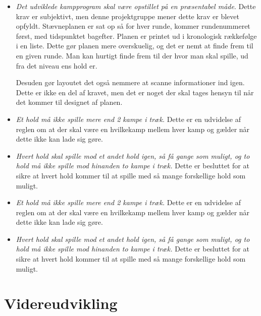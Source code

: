 \begin{itemize}
    \item \textit{Det udviklede kampprogram skal være opstillet på en præsentabel måde}. Dette krav er subjektivt, men denne projektgruppe mener dette krav er blevet opfyldt. Stævneplanen er sat op så for hver runde, kommer rundenummeret først, med tidspunktet bagefter. Planen er printet ud i kronologisk rækkefølge i en liste. Dette gør planen mere overskuelig, og det er nemt at finde frem til en given runde. Man kan hurtigt finde frem til der hvor man skal spille, ud fra det niveau ens hold er. 
    \par
    Desuden gør layoutet det også nemmere at scanne informationer ind igen. Dette er ikke en del af kravet, men det er noget der skal tages hensyn til når det kommer til designet af planen.
    \item \textit{Et hold må ikke spille mere end 2 kampe i træk.} Dette er en udvidelse af reglen om at der skal være en hvilkekamp mellem hver kamp og gælder når dette ikke kan lade sig gøre. 
    \item \textit{Hvert hold skal spille mod et andet hold igen, så få gange som muligt, og to hold må ikke spille mod hinanden to kampe i træk.} Dette er besluttet for at sikre at hvert hold kommer til at spille med så mange forskellige hold som muligt.
\end{itemize}


\begin{itemize}
    \item \textit{Et hold må ikke spille mere end 2 kampe i træk.} Dette er en udvidelse af reglen om at der skal være en hvilkekamp mellem hver kamp og gælder når dette ikke kan lade sig gøre. 
    \item \textit{Hvert hold skal spille mod et andet hold igen, så få gange som muligt, og to hold må ikke spille mod hinanden to kampe i træk.} Dette er besluttet for at sikre at hvert hold kommer til at spille med så mange forskellige hold som muligt.
\end{itemize}

\section{Videreudvikling}

